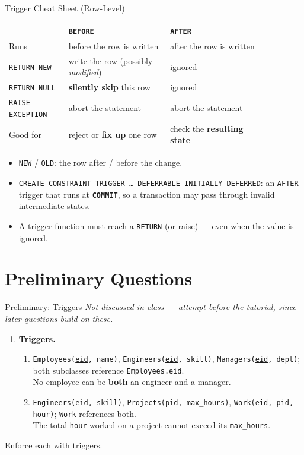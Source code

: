 \documentclass{beamer}
\begin{document}
\begin{frame}{Trigger Cheat Sheet (Row-Level)}
\footnotesize
\begin{center}
\renewcommand{\arraystretch}{1.3}
\begin{tabular}{p{0.2\linewidth}p{0.34\linewidth}p{0.34\linewidth}}
\toprule
 & \textbf{\texttt{BEFORE}} & \textbf{\texttt{AFTER}} \\
\midrule
Runs & before the row is written & after the row is written \\
\texttt{RETURN NEW} & write the row (possibly \emph{modified}) & ignored \\
\texttt{RETURN NULL} & \textbf{silently skip} this row & ignored \\
\texttt{RAISE EXCEPTION} & abort the statement & abort the statement \\
Good for & reject or \textbf{fix up} one row & check the \textbf{resulting state} \\
\bottomrule
\end{tabular}
\end{center}
\begin{itemize}
  \item \texttt{NEW} / \texttt{OLD}: the row after / before the change.
  \item \texttt{CREATE CONSTRAINT TRIGGER \ldots\ DEFERRABLE INITIALLY DEFERRED}: an \texttt{AFTER} trigger that runs at \textbf{\texttt{COMMIT}}, so a transaction may pass through invalid intermediate states.
  \item A trigger function must reach a \texttt{RETURN} (or raise) --- even when the value is ignored.
\end{itemize}
\end{frame}

\section{Preliminary Questions}

\begin{frame}{Preliminary: Triggers}
\small
\textit{Not discussed in class --- attempt before the tutorial, since later questions build on these.}
\begin{enumerate}
  \item[\textbf{1.}] \textbf{Triggers.}
  \begin{enumerate}
    \item[(a)] \texttt{Employees(\underline{eid}, name)}, \texttt{Engineers(\underline{eid}, skill)}, \texttt{Managers(\underline{eid}, dept)}; both subclasses reference \texttt{Employees.eid}.\\
    No employee can be \textbf{both} an engineer and a manager.
    \item[(b)] \texttt{Engineers(\underline{eid}, skill)}, \texttt{Projects(\underline{pid}, max\_hours)}, \texttt{Work(\underline{eid, pid}, hour)}; \texttt{Work} references both.\\
    The total \texttt{hour} worked on a project cannot exceed its \texttt{max\_hours}.
  \end{enumerate}
\end{enumerate}
\medskip
Enforce each with triggers.
\end{frame}
\end{document}
